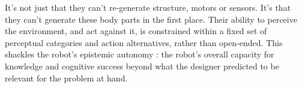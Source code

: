 It's not just that they can't re-generate structure, motors or sensors.
It's that they can't generate these
body parts
in the first place.
Their ability to perceive the environment, and act against it, 
is constrained within a fixed set of perceptual categories and action alternatives, rather than open-ended.
This shackles the robot's epistemic autonomy \cite{cariani1993evolve}:
the robot's overall capacity for 
knowledge 
and cognitive success beyond what
the designer predicted to be relevant for the problem at hand.




